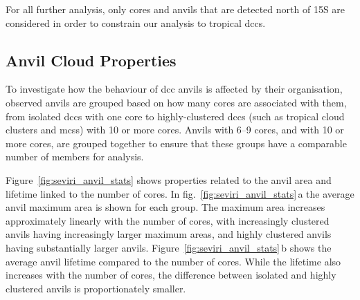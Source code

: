 For all further analysis, only cores and anvils that are detected north of 15\textdegree S are considered in order to constrain our analysis to tropical \acrshort{dcc}s.

\subsection{Anvil Cloud Properties}

To investigate how the behaviour of \acrshort{dcc} anvils is affected by their organisation, observed anvils are grouped based on how many cores are associated with them, from isolated \acrshort{dcc}s with one core to highly-clustered \acrshort{dcc}s (such as tropical cloud clusters and \acrshort{mcs}s) with 10 or more cores. 
Anvils with 6--9 cores, and with 10 or more cores, are grouped together to ensure that these groups have a comparable number of members for analysis.

Figure~\ref{fig:seviri_anvil_stats} shows properties related to the anvil area and lifetime linked to the number of cores. 
In fig.~\ref{fig:seviri_anvil_stats}\,a the average anvil maximum area is shown for each group. 
The maximum area increases approximately linearly with the number of cores, with increasingly clustered anvils having increasingly larger maximum areas, and highly clustered anvils having substantially larger anvils. 
Figure~\ref{fig:seviri_anvil_stats}\,b shows the average anvil lifetime compared to the number of cores. 
While the lifetime also increases with the number of cores, the difference between isolated and highly clustered anvils is proportionately smaller.


